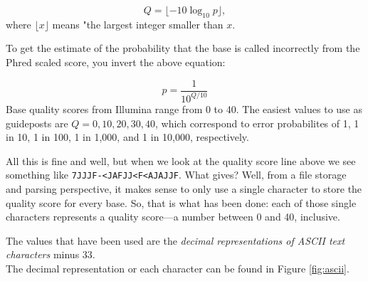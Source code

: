\documentclass[]{krantz}
\begin{document}
\[
Q = \lfloor-10\log_{10}p\rfloor,
\]
where \(\lfloor x \rfloor\) means "the largest integer smaller than \(x\).

To get the estimate of the probability that the base is called incorrectly from
the Phred scaled score, you invert the above equation:

\[
p = \frac{1}{10^{Q/10}}
\]
Base quality scores from Illumina range from 0 to 40.
The easiest values to use as guideposts are \(Q = 0, 10, 20, 30, 40\), which correspond to
error probabilites of 1, 1 in 10, 1 in 100, 1 in 1,000, and 1 in 10,000, respectively.

All this is fine and well, but when we look at the quality score line above we see
something like \texttt{7JJJF-\textless{}JAFJJ\textless{}F\textless{}AJAJJF}. What gives? Well, from a file storage and
parsing perspective, it makes sense to only use a single character to store the
quality score for every base. So, that is what has been done: each of those
single characters represents a quality score---a number between 0 and 40, inclusive.

The values that have been used are the \emph{decimal representations of ASCII text characters} minus 33.\\
The decimal representation or each character can be found in Figure \ref{fig:ascii}.
\end{document}
